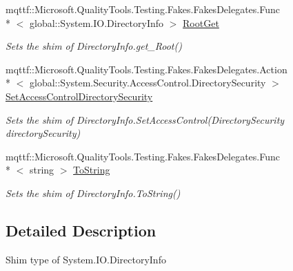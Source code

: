\begin{DoxyCompactItemize}
mqttf\-::\-Microsoft.\-Quality\-Tools.\-Testing.\-Fakes.\-Fakes\-Delegates.\-Func\\*
$<$ global\-::\-System.\-I\-O.\-Directory\-Info $>$ \hyperlink{class_system_1_1_i_o_1_1_fakes_1_1_shim_directory_info_aff0a736879e4fc33a52f048cee3c178b}{Root\-Get}
\begin{DoxyCompactList}\small\item\em Sets the shim of Directory\-Info.\-get\-\_\-\-Root()\end{DoxyCompactList}\item 
mqttf\-::\-Microsoft.\-Quality\-Tools.\-Testing.\-Fakes.\-Fakes\-Delegates.\-Action\\*
$<$ global\-::\-System.\-Security.\-Access\-Control.\-Directory\-Security $>$ \hyperlink{class_system_1_1_i_o_1_1_fakes_1_1_shim_directory_info_a896a99faac99c62939cafa85102ec1f2}{Set\-Access\-Control\-Directory\-Security}
\begin{DoxyCompactList}\small\item\em Sets the shim of Directory\-Info.\-Set\-Access\-Control(\-Directory\-Security directory\-Security)\end{DoxyCompactList}\item 
mqttf\-::\-Microsoft.\-Quality\-Tools.\-Testing.\-Fakes.\-Fakes\-Delegates.\-Func\\*
$<$ string $>$ \hyperlink{class_system_1_1_i_o_1_1_fakes_1_1_shim_directory_info_ae1a70a7f0c5c0c4544e44e0610538ded}{To\-String}
\begin{DoxyCompactList}\small\item\em Sets the shim of Directory\-Info.\-To\-String()\end{DoxyCompactList}\end{DoxyCompactItemize}


\subsection{Detailed Description}
Shim type of System.\-I\-O.\-Directory\-Info



